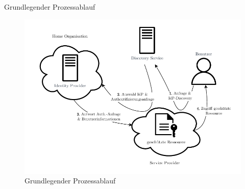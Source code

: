 \begin{frame}{Grundlegender Prozessablauf}
    \begin{figure}
        \includegraphics[height=0.7\paperheight]{../assets/basic_interaction_article.drawio.pdf}
        \caption{Grundlegender Prozessablauf~\cite{michelsIdentityManagementUnd, shibbolethShibbolethConcepts2023, switchExpertDemoSWITCHaai2024a}}
    \end{figure}
\end{frame}
